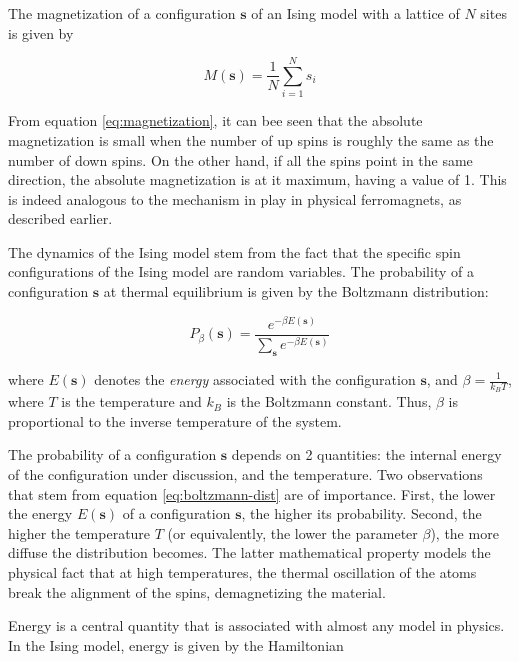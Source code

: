 \documentclass[12pt]{article}
\begin{document}
The magnetization of a configuration $\boldsymbol{s}$ of an Ising model with a lattice of $N$ sites is given by 

\begin{equation}
M(\boldsymbol{s}) = \frac{1}{N} \sum_{i=1}^N s_i
\label{eq:magnetization}
\end{equation}

From equation \ref{eq:magnetization}, it can bee seen that the absolute magnetization is small when the number of up spins is roughly the same as the number of down spins. On the other hand, if all the spins point in the same direction, the absolute magnetization is at it maximum, having a value of 1. This is indeed analogous to the mechanism in play in physical ferromagnets, as described earlier. 

The dynamics of the Ising model stem from the fact that the specific spin configurations of the Ising model are random variables. The probability of a configuration $\boldsymbol{s}$ at thermal equilibrium is given by the Boltzmann distribution: 

\begin{equation}
P_\beta(\boldsymbol{s}) = \frac{e^{-\beta E(\boldsymbol{s})}}{\sum_{\boldsymbol{s}} e^{-\beta E(\boldsymbol{s})}}
\label{eq:boltzmann-dist}
\end{equation}

where $E(\boldsymbol{s})$ denotes the \textit{energy} associated with the configuration $\boldsymbol{s}$, and $\beta = \frac{1}{k_B T}$, where $T$ is the temperature and $k_B$ is the Boltzmann constant. Thus, $\beta$ is proportional to the inverse temperature of the system.  

The probability of a configuration $\boldsymbol{s}$ depends on 2 quantities: the internal energy of the configuration under discussion, and the temperature. Two observations that stem from equation \ref{eq:boltzmann-dist} are of importance. First, the lower the energy $E(\boldsymbol{s})$ of a configuration $\boldsymbol{s}$, the higher its probability. Second, the higher the temperature $T$ (or equivalently, the lower the parameter $\beta$), the more diffuse the distribution becomes. The latter mathematical property models the physical fact that at high temperatures, the thermal oscillation of the atoms break the alignment of the spins, demagnetizing the material. 

Energy is a central quantity that is associated with almost any model in physics. In the Ising model, energy is given by the Hamiltonian
\end{document}
